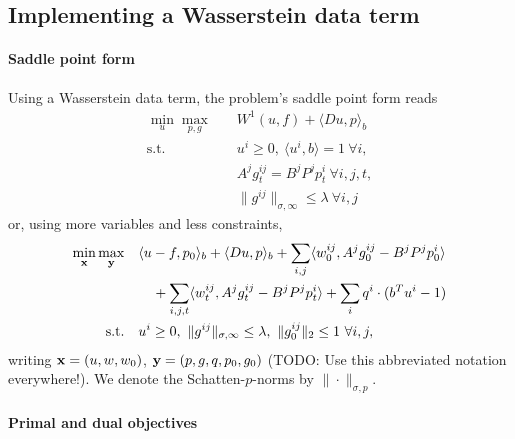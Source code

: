 
\subsection{Implementing a Wasserstein data term}

\paragraph{Saddle point form}

Using a Wasserstein data term, the problem's saddle point form reads
\begin{align*}
    \min_{u} \max_{p,g} \quad
        & W^1(u,f) + \langle Du, p \rangle_b \\
    \text{s.t.}\quad 
        & u^i \geq 0, ~\langle u^i, b \rangle = 1 ~\forall i, \\
        & A^j g^{ij}_t = B^j P^j p^i_t ~\forall i,j,t, \\
        & \|g^{ij}\|_{\sigma,\infty} \leq \lambda ~\forall i,j
\end{align*}
or, using more variables and less constraints,
\begin{align*}
    \min_{\mathbf{x}} \max_{\mathbf{y}} \quad
        & \langle u-f, p_0 \rangle_b
            + \langle Du, p \rangle_b
            + \sum_{i,j} \langle w_0^{ij}, A^j g_0^{ij} - B^j P^j p_0^i \rangle
            \\
        &\quad + \sum_{i,j,t} \langle w^{ij}_t, A^j g^{ij}_t - B^j P^j p^i_t \rangle
            + \sum_{i} q^i \cdot (b^T u^i - 1) \\
    \text{s.t.}\quad 
        & u^i \geq 0,
            ~\|g^{ij}\|_{\sigma,\infty} \leq \lambda,
            ~\|g_0^{ij}\|_{2} \leq 1 ~\forall i,j,
\end{align*}
writing $\mathbf{x} = (u,w,w_0)$, $\mathbf{y} = (p,g,q,p_0,g_0)$ (TODO: Use this 
abbreviated notation everywhere!).
We denote the Schatten-$p$-norms by $\|\cdot\|_{\sigma,p}$.

\paragraph{Primal and dual objectives}

